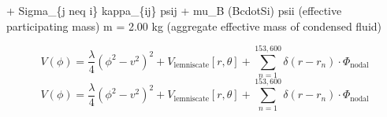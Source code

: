 
\begin{tzpsnapshot}
\end{tzpsnapshot}

+ Sigma\_\{j neq i\} kappa\_\{ij\} psij + mu\_B (BcdotSi) psii (effective participating mass) m = 2.00 kg (aggregate effective mass of condensed fluid)

\[
V(\phi) = \frac{\lambda}{4}(\phi^2 - v^2)^2 + V_{\text{lemniscate}}[r, \theta] + \sum_{n=1}^{153,600} \delta(r - r_n) \cdot \Phi_{\text{nodal}}
\]
\[
V(\phi) = \frac{\lambda}{4}(\phi^2 - v^2)^2 + V_{\text{lemniscate}}[r, \theta] + \sum_{n=1}^{153,600} \delta(r - r_n) \cdot \Phi_{\text{nodal}}
\]

